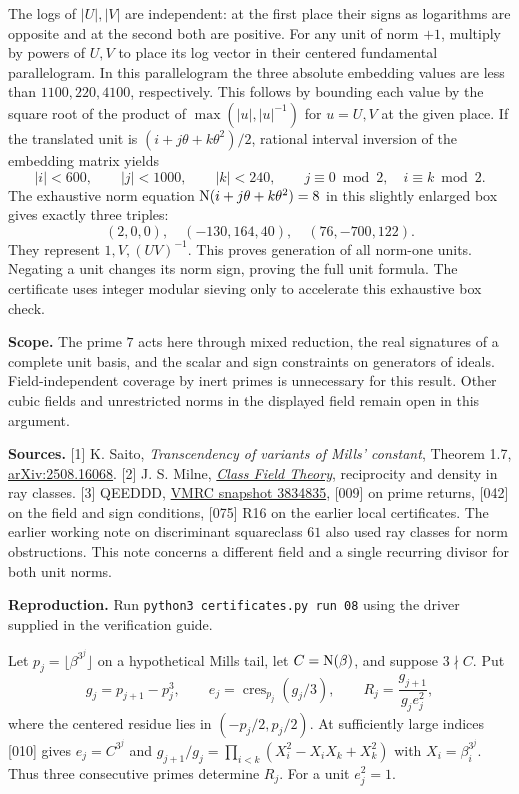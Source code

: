 \documentclass[11pt,a4paper,oneside,openany]{book}
\begin{document}
The logs of $|U|,|V|$ are independent: at the first place their signs as logarithms are opposite and at the second both are positive. For any unit of norm $+1$, multiply by powers of $U,V$ to place its log vector in their centered fundamental parallelogram. In this parallelogram the three absolute embedding values are less than $1100,220,4100$, respectively. This follows by bounding each value by the square root of the product of $\max(|u|,|u|^{-1})$ for $u=U,V$ at the given place. If the translated unit is $(i+j\theta+k\theta^2)/2$, rational interval inversion of the embedding matrix yields
\[
 |i|<600,\qquad |j|<1000,\qquad |k|<240,\qquad
 j\equiv0\bmod2,\quad i\equiv k\bmod2 .
\]
The exhaustive norm equation $\operatorname{N}(i+j\theta+k\theta^2)=8$ in this slightly enlarged box gives exactly three triples:
\[
 (2,0,0),\quad(-130,164,40),\quad(76,-700,122).
\]
They represent $1,V,(UV)^{-1}$. This proves generation of all norm-one units. Negating a unit changes its norm sign, proving the full unit formula. The certificate uses integer modular sieving only to accelerate this exhaustive box check.

\textbf{Scope.} The prime $7$ acts here through mixed reduction, the real signatures of a complete unit basis, and the scalar and sign constraints on generators of ideals. Field-independent coverage by inert primes is unnecessary for this result. Other cubic fields and unrestricted norms in the displayed field remain open in this argument.

\textbf{Sources.} [1] K. Saito, \emph{Transcendency of variants of Mills' constant}, Theorem 1.7, \href{https://arxiv.org/abs/2508.16068}{arXiv:2508.16068}. [2] J. S. Milne, \href{https://www.jmilne.org/math/CourseNotes/CFT.pdf}{\emph{Class Field Theory}}, reciprocity and density in ray classes. [3] QEEDDD, \href{https://github.com/QEEDDD/Verifiable-Mathematical-Reasoning-Corpus/tree/38348353416f1f7fc50cecb93c3b554a00260c13}{VMRC snapshot 3834835}, [009] on prime returns, [042] on the field and sign conditions, [075] R16 on the earlier local certificates. The earlier working note on discriminant squareclass $61$ also used ray classes for norm obstructions. This note concerns a different field and a single recurring divisor for both unit norms.

\textbf{Reproduction.} Run \texttt{python3 certificates.py run 08} using the driver supplied in the verification guide.


Let $p_j=\lfloor\beta^{3^j}\rfloor$ on a hypothetical Mills tail, let $C=\operatorname{N}(\beta)$, and suppose $3\nmid C$. Put
\[
 g_j=p_{j+1}-p_j^3,\qquad
 e_j=\operatorname{cres}_{p_j}(g_j/3),\qquad
 R_j=\frac{g_{j+1}}{g_j e_j^2},
\]
where the centered residue lies in $(-p_j/2,p_j/2)$. At sufficiently large indices [010] gives $e_j=C^{3^j}$ and $g_{j+1}/g_j=\prod_{i<k}(X_i^2-X_iX_k+X_k^2)$ with $X_i=\beta_i^{3^j}$. Thus three consecutive primes determine $R_j$. For a unit $e_j^2=1$.
\end{document}
